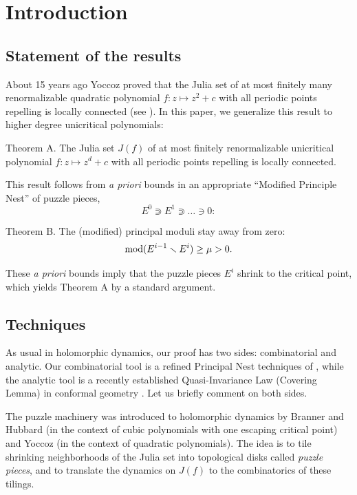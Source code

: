 
\section{Introduction}\label{intro}

\subsection{Statement of  the results}  

About 15 years ago Yoccoz proved that the Julia set of at most finitely many renormalizable quadratic polynomial
$f: z\mapsto z^2+c$ with all periodic points repelling is locally connected (see \cite{H,M}).
In this paper, we generalize this result to higher degree unicritical polynomials: 

\proclaim Theorem A. 
The Julia set $J(f)$ of 
at most finitely renormalizable unicritical polynomial  $f: z\mapsto  z^d+c$  with all periodic points repelling 
is locally connected.

This result follows from {\it a priori} bounds in an appropriate 
``Modified Principle Nest''  of puzzle pieces,
$$
  E^0\Supset E^1\Supset\dots \ni 0: 
$$

\proclaim Theorem B. The (modified) principal moduli stay away from zero:
$$
    \operatorname{mod}(E^{i-1}\smallsetminus E^i)\geq \mu > 0.
$$

These {\it a priori} bounds imply that the puzzle pieces $E^i$ shrink to the critical point,
which yields Theorem A by a standard argument.%


\subsection{Techniques}

As usual in holomorphic dynamics, our proof has two sides: combinatorial and analytic.
Our combinatorial tool is a refined  Principal Nest techniques of \cite{puzzle}, 
while the analytic tool is a recently established
Quasi-Invariance Law (Covering Lemma) in conformal geometry \cite{covering lemma}.  
Let us briefly comment on both sides. 

The puzzle machinery was introduced to holomorphic dynamics by Branner and Hubbard \cite{BH}
(in the context of cubic polynomials with one escaping critical point) and
Yoccoz \cite{H,M} (in the context of quadratic polynomials). 
The idea is to tile shrinking neighborhoods
of the Julia set into topological disks called {\it puzzle pieces}, 
and to translate the dynamics on $J(f)$ to the combinatorics of these tilings.

